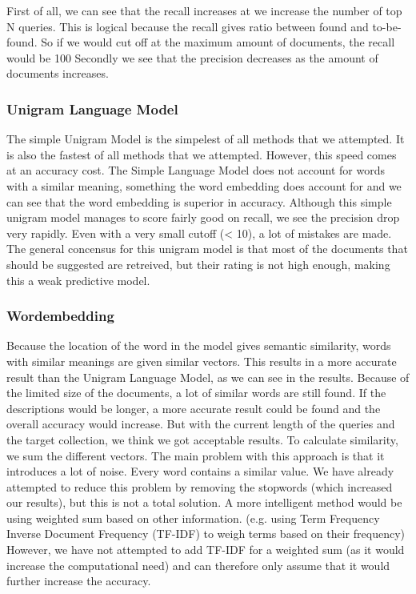 First of all, we can see that the recall increases at we increase the number of top N queries. This is logical because the recall gives ratio between found and to-be-found. So if we would cut off at the maximum amount of documents, the recall would be 100%
\newline
Secondly we see that the precision decreases as the amount of documents increases. 

\subsubsection{Unigram Language Model}
The simple Unigram Model is the simpelest of all methods that we attempted. It is also the fastest of all methods that we attempted. However, this speed comes at an accuracy cost.
The Simple Language Model does not account for words with a similar meaning, something the word embedding does account for and we can see that the word embedding is superior in accuracy.
Although this simple unigram model manages to score fairly good on recall, we see the precision drop very rapidly. Even with a very small cutoff (< 10), a lot of mistakes are made. The general concensus for this unigram model is that most of the documents that should be suggested are retreived, but their rating is not high enough, making this a weak predictive model.

\subsubsection{Wordembedding}
Because the location of the word in the model gives semantic similarity, words with similar meanings are given similar vectors. This results in a more accurate result than the Unigram Language Model, as we can see in the results.
Because of the limited size of the documents, a lot of similar words are still found. If the descriptions would be longer, a more accurate result could be found and the overall accuracy would increase. But with the current length of the queries and the target collection, we think we got acceptable results.
\newline
\newline
To calculate similarity, we sum the different vectors. The main problem with this approach is that it introduces a lot of noise. Every word contains a similar value. We have already attempted to reduce this problem by removing the stopwords (which increased our results), but this is not a total solution. A more intelligent method would be using weighted sum based on other information. (e.g. using Term Frequency Inverse Document Frequency (TF-IDF) to weigh terms based on their frequency) However, we have not attempted to add TF-IDF for a weighted sum (as it would increase the computational need) and can therefore only assume that it would further increase the accuracy.

